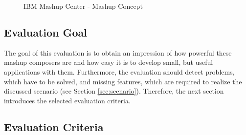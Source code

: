 \begin{figure}
	\centering
	\caption{IBM Mashup Center - Mashup Concept}
	\label{fig:ibm_mashup_center_mashup_concept}
\end{figure}

\subsection{Evaluation Goal}

The goal of this evaluation is to obtain an impression of how powerful these mashup composers
are and how easy it is to develop small, but useful applications with them. Furthermore, the
evaluation should detect problems, which have to be solved, and missing features, which are
required to realize the discussed scenario (see Section \ref{sec:scenario}). Therefore, the next section introduces the
selected evaluation criteria.

\subsection{Evaluation Criteria}
\label{sec:evaluation_criterions}

